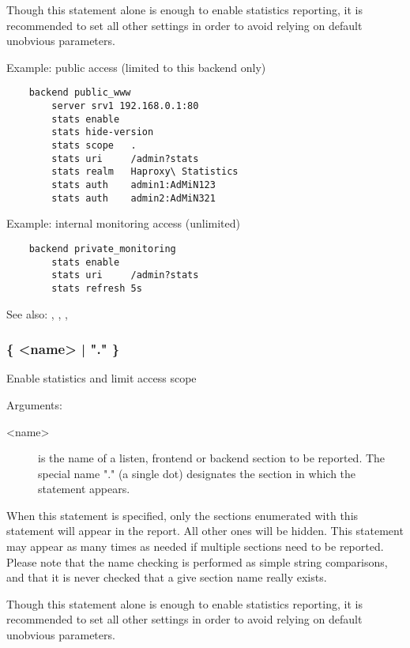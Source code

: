   Though this statement alone is enough to enable statistics reporting, it is
  recommended to set all other settings in order to avoid relying on default
  unobvious parameters.

  Example: public access (limited to this backend only)
  \begin{verbatim}
    backend public_www
        server srv1 192.168.0.1:80
        stats enable
        stats hide-version
        stats scope   .
        stats uri     /admin?stats
        stats realm   Haproxy\ Statistics
        stats auth    admin1:AdMiN123
        stats auth    admin2:AdMiN321
   \end{verbatim}

   Example: internal monitoring access (unlimited)
   \begin{verbatim}
    backend private_monitoring
        stats enable
        stats uri     /admin?stats
        stats refresh 5s
   \end{verbatim}


See also: , , , 

\subsubsection[stats scope]{ \{ <name> | "." \}}

  Enable statistics and limit access scope


  Arguments:
  \begin{description}
  \item[<name>] is the name of a listen, frontend or backend section to be
              reported. The special name "." (a single dot) designates the
              section in which the statement appears.
  \end{description}

  When this statement is specified, only the sections enumerated with this
  statement will appear in the report. All other ones will be hidden. This
  statement may appear as many times as needed if multiple sections need to be
  reported. Please note that the name checking is performed as simple string
  comparisons, and that it is never checked that a give section name really
  exists.

  Though this statement alone is enough to enable statistics reporting, it is
  recommended to set all other settings in order to avoid relying on default
  unobvious parameters.

